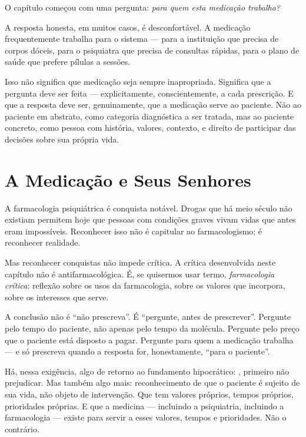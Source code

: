 O capítulo começou com uma pergunta: \textit{para quem esta medicação trabalha?}

A resposta honesta, em muitos casos, é desconfortável. A medicação frequentemente trabalha para o sistema --- para a instituição que precisa de corpos dóceis, para o psiquiatra que precisa de consultas rápidas, para o plano de saúde que prefere pílulas a sessões.

Isso não significa que medicação seja sempre inapropriada. Significa que a pergunta deve ser feita --- explicitamente, conscientemente, a cada prescrição. E que a resposta deve ser, genuinamente, que a medicação serve ao paciente. Não ao paciente em abstrato, como categoria diagnóstica a ser tratada, mas ao paciente concreto, como pessoa com história, valores, contexto, e direito de participar das decisões sobre sua própria vida.

\section{A Medicação e Seus Senhores}
\label{sec:medicacao-senhores}

A farmacologia psiquiátrica é conquista notável. Drogas que há meio século não existiam permitem hoje que pessoas com condições graves vivam vidas que antes eram impossíveis. Reconhecer isso não é capitular ao farmacologismo; é reconhecer realidade.

Mas reconhecer conquistas não impede crítica. A crítica desenvolvida neste capítulo não é antifarmacológica. É, se quisermos usar termo, \textit{farmacologia crítica}: reflexão sobre os usos da farmacologia, sobre os valores que incorpora, sobre os interesses que serve.

A conclusão não é \enquote{não prescreva}. É \enquote{pergunte, antes de prescrever}. Pergunte pelo tempo do paciente, não apenas pelo tempo da molécula. Pergunte pelo preço que o paciente está disposto a pagar. Pergunte para quem a medicação trabalha --- e só prescreva quando a resposta for, honestamente, \enquote{para o paciente}.

Há, nessa exigência, algo de retorno ao fundamento hipocrático: , primeiro não prejudicar. Mas também algo mais: reconhecimento de que o paciente é sujeito de sua vida, não objeto de intervenção. Que tem valores próprios, tempos próprios, prioridades próprias. E que a medicina --- incluindo a psiquiatria, incluindo a farmacologia --- existe para servir a esses valores, tempos e prioridades. Não o contrário.

